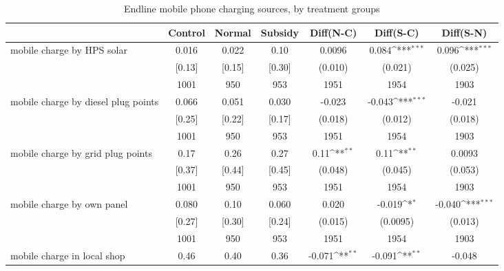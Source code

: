 \begin{table}[htbp]\centering
\def\sym#1{\ifmmode^{#1}\else\(^{#1}\)\fi}
\caption{Endline mobile phone charging sources, by treatment groups \label{tab:"balance"}}
\begin{tabular*}{1\hsize}{@{\hskip\tabcolsep\extracolsep\fill}l*{1}{cccccc}}
\toprule
                                &  Control&   Normal&  Subsidy&Diff(N-C)         &Diff(S-C)         &Diff(S-N)         \\
\midrule
mobile charge by HPS solar      &    0.016&    0.022&     0.10&   0.0096         &    0.084\sym{***}&    0.096\sym{***}\\
                                &   [0.13]&   [0.15]&   [0.30]&  (0.010)         &  (0.021)         &  (0.025)         \\
                                &     1001&      950&      953&     1951         &     1954         &     1903         \\
mobile charge by diesel plug points&    0.066&    0.051&    0.030&   -0.023         &   -0.043\sym{***}&   -0.021         \\
                                &   [0.25]&   [0.22]&   [0.17]&  (0.018)         &  (0.012)         &  (0.018)         \\
                                &     1001&      950&      953&     1951         &     1954         &     1903         \\
mobile charge by grid plug points&     0.17&     0.26&     0.27&     0.11\sym{**} &     0.11\sym{**} &   0.0093         \\
                                &   [0.37]&   [0.44]&   [0.45]&  (0.048)         &  (0.045)         &  (0.053)         \\
                                &     1001&      950&      953&     1951         &     1954         &     1903         \\
mobile charge by own panel      &    0.080&     0.10&    0.060&    0.020         &   -0.019\sym{*}  &   -0.040\sym{***}\\
                                &   [0.27]&   [0.30]&   [0.24]&  (0.015)         & (0.0095)         &  (0.013)         \\
                                &     1001&      950&      953&     1951         &     1954         &     1903         \\
mobile charge in local shop     &     0.46&     0.40&     0.36&   -0.071\sym{**} &   -0.091\sym{**} &   -0.048         \\

\end{tabular*}
\end{table}
